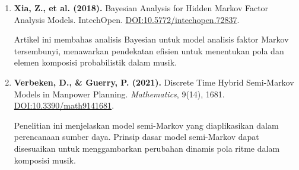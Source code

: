 \documentclass[a4paper,12pt]{article}
\begin{document}
\begin{enumerate}
    \item \textbf{Xia, Z., et al. (2018).} Bayesian Analysis for Hidden Markov Factor Analysis Models. IntechOpen. \href{https://doi.org/10.5772/intechopen.72837}{DOI:10.5772/intechopen.72837}.\par
    Artikel ini membahas analisis Bayesian untuk model analisis faktor Markov tersembunyi, menawarkan pendekatan efisien untuk menentukan pola dan elemen komposisi probabilistik dalam musik.

    \item \textbf{Verbeken, D., \& Guerry, P. (2021).} Discrete Time Hybrid Semi-Markov Models in Manpower Planning. \textit{Mathematics}, 9(14), 1681. \href{https://doi.org/10.3390/math9141681}{DOI:10.3390/math9141681}.\par
    Penelitian ini menjelaskan model semi-Markov yang diaplikasikan dalam perencanaan sumber daya. Prinsip dasar model semi-Markov dapat disesuaikan untuk menggambarkan perubahan dinamis pola ritme dalam komposisi musik.
\end{enumerate}

\vspace{1cm}
\end{document}
